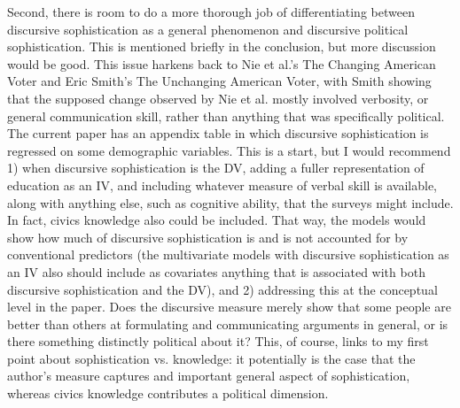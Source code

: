 Second, there is room to do a more thorough job of differentiating between discursive sophistication as a general phenomenon and discursive political sophistication. This is mentioned briefly in the conclusion, but more discussion would be good. This issue harkens back to Nie et al.'s The Changing American Voter and Eric Smith's The Unchanging American Voter, with Smith showing that the supposed change observed by Nie et al. mostly involved verbosity, or general communication skill, rather than anything that was specifically political. The current paper has an appendix table in which discursive sophistication is regressed on some demographic variables. This is a start, but I would recommend 1) when discursive sophistication is the DV, adding a fuller representation of education as an IV, and including whatever measure of verbal skill is available, along with anything else, such as cognitive ability, that the surveys might include. In fact, civics knowledge also could be included. That way, the models would show how much of discursive sophistication is and is not accounted for by conventional predictors (the multivariate models with discursive sophistication as an IV also should include as covariates anything that is associated with both discursive sophistication and the DV), and 2) addressing this at the conceptual level in the paper. Does the discursive measure merely show that some people are better than others at formulating and communicating arguments in general, or is there something distinctly political about it? This, of course, links to my first point about sophistication vs. knowledge: it potentially is the case that the author's measure captures and important general aspect of sophistication, whereas civics knowledge contributes a political dimension.

